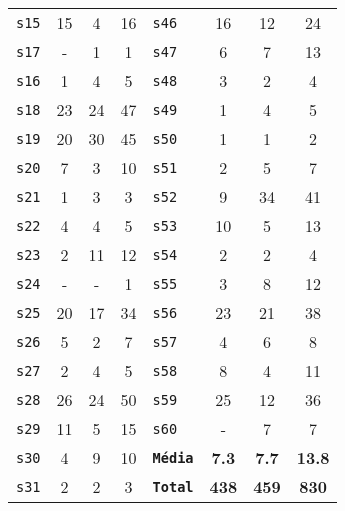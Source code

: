 \begin{longtable}{ l c c c | l c c c }
\texttt{s15} & 15 & 4 & 16 & \texttt{s46} & 16 & 12 & 24 \\
\texttt{s17} & - & 1 & 1 & \texttt{s47} & 6 & 7 & 13 \\
\texttt{s16} & 1 & 4 & 5 & \texttt{s48} & 3 & 2 & 4 \\
\texttt{s18} & 23 & 24 & 47 & \texttt{s49} & 1 & 4 & 5 \\
\texttt{s19} & 20 & 30 & 45 & \texttt{s50} & 1 & 1 & 2 \\
\texttt{s20} & 7 & 3 & 10 & \texttt{s51} & 2 & 5 & 7 \\
\texttt{s21} & 1 & 3 & 3 & \texttt{s52} & 9 & 34 & 41 \\
\texttt{s22} & 4 & 4 & 5 & \texttt{s53} & 10 & 5 & 13 \\
\texttt{s23} & 2 & 11 & 12 & \texttt{s54} & 2 & 2 & 4 \\
\texttt{s24} & - & - & 1 & \texttt{s55} & 3 & 8 & 12 \\
\texttt{s25} & 20 & 17 & 34 & \texttt{s56} & 23 & 21 & 38 \\
\texttt{s26} & 5 & 2 & 7 & \texttt{s57} & 4 & 6 & 8 \\
\texttt{s27} & 2 & 4 & 5 & \texttt{s58} & 8 & 4 & 11 \\
\texttt{s28} & 26 & 24 & 50 & \texttt{s59} & 25 & 12 & 36 \\
\texttt{s29} & 11 & 5 & 15 & \texttt{s60} & - & 7 & 7 \\
\texttt{s30} & 4 & 9 & 10 & \texttt{{\bf Média}} & {\bf 7.3} & {\bf 7.7} & {\bf 13.8} \\
\texttt{s31} & 2 & 2 & 3 & \texttt{{\bf Total}} & {\bf 438} & {\bf 459} & {\bf 830} \\
\end{longtable}
